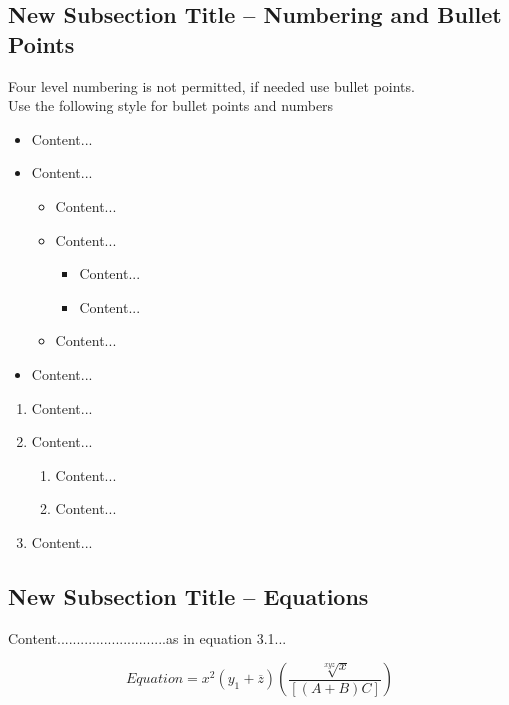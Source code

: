 \subsection{New Subsection Title – Numbering and Bullet Points}
\begin{justify}

    Four level numbering is not permitted, if needed use bullet points.\\
    Use the following style for bullet points and numbers
    \begin{itemize}
        \item Content...
        \item Content...
            \begin{itemize}
                \item Content...
                \item Content...
                    \begin{itemize}
                        \item Content...
                        \item Content...
                    \end{itemize}
                \item Content...
            \end{itemize}
        \item Content...
    \end{itemize}

    \begin{enumerate}
        \item Content...
        \item Content...
            \begin{enumerate}
                \item Content...
                \item Content...
            \end{enumerate}
        \item Content...
    \end{enumerate}
    
\end{justify}

\subsection{New Subsection Title – Equations}
\begin{justify}
    
   Content............................as in equation 3.1...
    \begin{fleqn}
        \begin{equation}
            Equation = x^2 (y_1 + \overline{z}) \left( \frac{\sqrt[xyz]{x}}{[(A+B) C]} \right)
            \label{eq:1}    
        \end{equation}
   \end{fleqn}
    
\end{justify}


